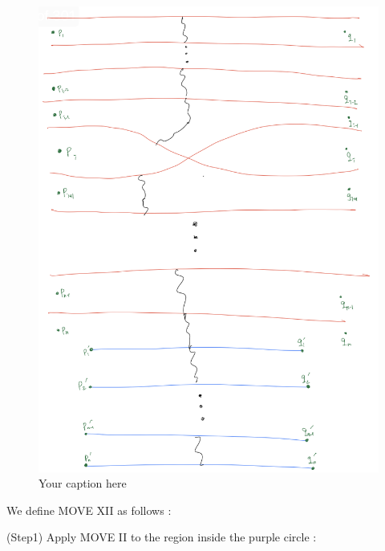 \begin{figure}[H] %
    \centering
    \includegraphics[width=\linewidth]{diagrams/definition12/2.png} %
    \caption{Your caption here}
    \label{fig:your-label}
\end{figure}

We define MOVE \RN{12} as follows :

(Step1) Apply MOVE \RN{2} to the region inside the purple circle :

